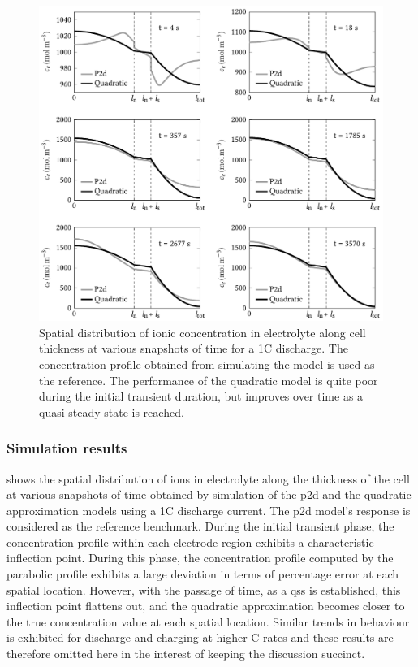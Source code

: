 \begin{figure}[!htb]
    \centering
    \includegraphics[width=\textwidth]{4/figures/quadratic_ce_approx_spatial_1C.pdf}
    \caption[Spatial distribution of electrolyte concentration for 1C
    discharge]{Spatial distribution of ionic concentration in electrolyte along
        cell thickness at various snapshots of time for a 1C discharge. The
        concentration profile obtained from simulating the 
        model is used as the reference. The performance of the quadratic model
        is quite poor during the initial transient duration, but improves over
    time as a quasi-steady state is reached.}
    \label{fig:spatialionicconc1C}
\end{figure}


\subsubsection*{Simulation results}
 shows  the spatial distribution of   ions
in electrolyte  along the  thickness of  the cell at  various snapshots  of time
obtained by simulation  of the \gls{p2d} and the  quadratic approximation models
using a  1C discharge current. The  \gls{p2d} model's response is  considered as
the reference benchmark.  During the initial transient  phase, the concentration
profile within each electrode region exhibits a characteristic inflection point.
During this phase,  the concentration profile computed by  the parabolic profile
exhibits  a  large deviation  in  terms  of  percentage  error at  each  spatial
location. However, with the passage of time, as a \gls{qss} is established, this
inflection point flattens out, and the quadratic approximation becomes closer to
the  true  concentration value  at  each  spatial  location. Similar  trends  in
behaviour is  exhibited for discharge and  charging at higher C-rates  and these
results are  therefore omitted here  in the  interest of keeping  the discussion
succinct.

